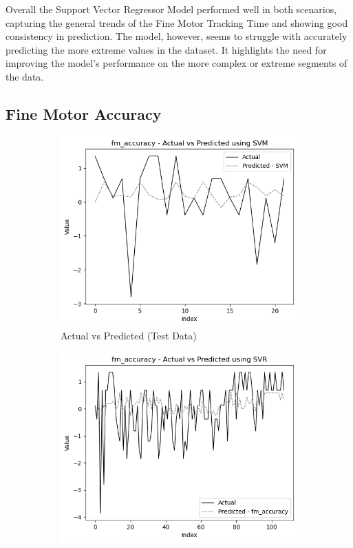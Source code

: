 Overall the Support Vector Regressor Model performed well in both scenarios, capturing the general trends of the Fine Motor Tracking Time and showing good consistency in prediction.
The model, however, seems to struggle with accurately predicting the more extreme values in the dataset. It highlights the need for improving the model's performance on the more complex
or extreme segments of the data.

\subsection*{Fine Motor Accuracy}

\begin{figure}[htbp]
    \centering
    \begin{subfigure}[b]{0.49\textwidth}
        \centering
        \includegraphics[width=\textwidth]{images/regressionCharts/test_data_fine_motor_accuracy.png}
        \caption{Actual vs Predicted (Test Data)}
        \label{fig:actual_vs_predicted_fm_accuracy_test}
    \end{subfigure}\hfill
    \begin{subfigure}[b]{0.49\textwidth}
        \centering
        \includegraphics[width=\textwidth]{images/regressionCharts/all_data_fine_motor_accuracy.png}

\end{subfigure}
\end{figure}
